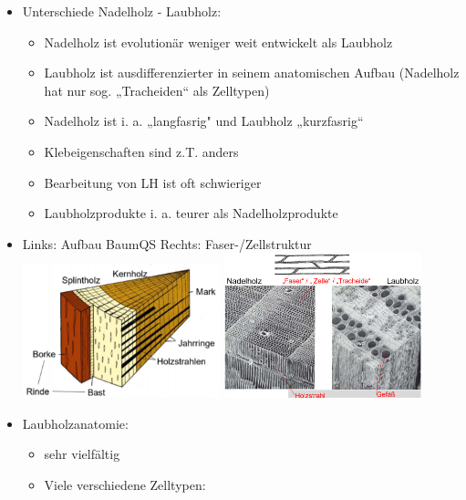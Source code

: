 \documentclass[fleqn,twoside]{article}
\begin{document}
        \begin{itemize}
            \item Unterschiede Nadelholz - Laubholz:
                \begin{itemize}
                    \item Nadelholz ist evolutionär weniger weit entwickelt als Laubholz
                    \item Laubholz ist ausdifferenzierter in seinem anatomischen Aufbau (Nadelholz hat nur sog. „Tracheiden“ als Zelltypen)
                    \item Nadelholz ist i. a. „langfasrig" und Laubholz „kurzfasrig“
                    \item Klebeigenschaften sind z.T. anders
                    \item Bearbeitung von LH ist oft schwieriger
                    \item Laubholzprodukte i. a. teurer als Nadelholzprodukte
                \end{itemize}
            \item Links: Aufbau BaumQS Rechts: Faser-/Zellstruktur\\
                \includegraphics[width=0.45\textwidth]{Grafiken/Laubholz/BaumQS.png}
                \includegraphics[width=0.45\textwidth]{Grafiken/Laubholz/Zellstruktur.png}\\
            \item Laubholzanatomie:
                \begin{itemize}
                    \item sehr vielfältig
                    \item Viele verschiedene Zelltypen:

\end{itemize}
\end{itemize}
\end{document}
